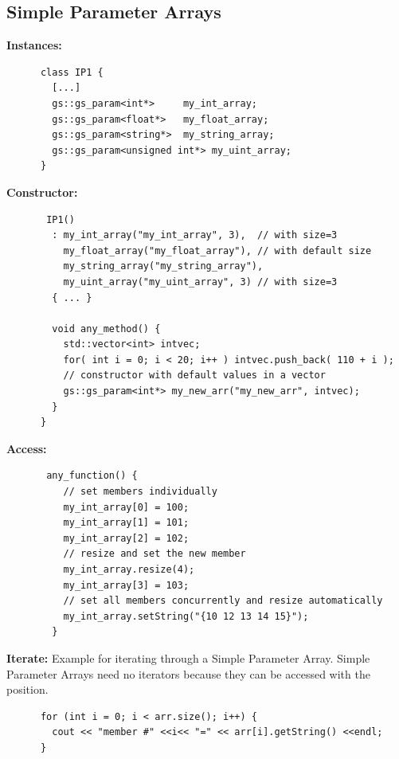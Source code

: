 \subsection{Simple Parameter Arrays}
\label{SimpleParArr}

\noindent
\begin{minipage}{\textwidth}
{\bf Instances:}
\begin{lstlisting}
      class IP1 {
        [...]
        gs::gs_param<int*>     my_int_array;
        gs::gs_param<float*>   my_float_array;
        gs::gs_param<string*>  my_string_array;
        gs::gs_param<unsigned int*> my_uint_array;
      }
\end{lstlisting}
\end{minipage}

\noindent
\begin{minipage}{\textwidth}
{\bf Constructor:}
\begin{lstlisting}
       IP1()
        : my_int_array("my_int_array", 3),  // with size=3
          my_float_array("my_float_array"), // with default size
          my_string_array("my_string_array"),
          my_uint_array("my_uint_array", 3) // with size=3
        { ... }
       
        void any_method() {
          std::vector<int> intvec;
          for( int i = 0; i < 20; i++ ) intvec.push_back( 110 + i );
          // constructor with default values in a vector
          gs::gs_param<int*> my_new_arr("my_new_arr", intvec);
        }
      }
\end{lstlisting}
\end{minipage}

\noindent
\begin{minipage}{\textwidth}
{\bf Access:}
\begin{lstlisting}
       any_function() {
          // set members individually
          my_int_array[0] = 100;
          my_int_array[1] = 101;
          my_int_array[2] = 102;
          // resize and set the new member
          my_int_array.resize(4);
          my_int_array[3] = 103;
          // set all members concurrently and resize automatically
          my_int_array.setString("{10 12 13 14 15}");
        }
\end{lstlisting}
\end{minipage}

\noindent
\begin{minipage}{\textwidth}
{\bf Iterate:}
Example for iterating through a Simple Parameter Array. Simple Parameter Arrays need no iterators because they can be accessed with the position.
\begin{lstlisting}
      for (int i = 0; i < arr.size(); i++) {
        cout << "member #" <<i<< "=" << arr[i].getString() <<endl;
      }
\end{lstlisting}
\end{minipage}

